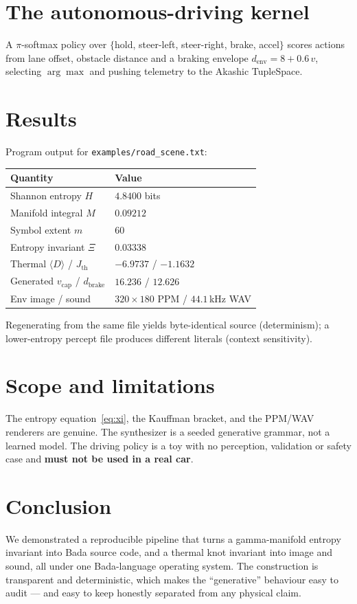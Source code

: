 \documentclass[11pt]{article}
\begin{document}
\section{The autonomous-driving kernel}
A $\pi$-softmax policy over $\{$hold, steer-left, steer-right, brake, accel$\}$
scores actions from lane offset, obstacle distance and a braking envelope
$d_{\text{env}}=8+0.6\,v$, selecting $\arg\max$ and pushing telemetry to the
Akashic TupleSpace.

\section{Results}
Program output for \texttt{examples/road\_scene.txt}:
\begin{center}
\begin{tabular}{l l}
\hline
Quantity & Value\\\hline
Shannon entropy $H$ & $4.8400$ bits\\
Manifold integral $M$ & $0.09212$\\
Symbol extent $m$ & $60$\\
Entropy invariant $\Xi$ & $0.03338$\\
Thermal $\langle D\rangle$ / $J_{\text{th}}$ & $-6.9737$ / $-1.1632$\\
Generated $v_{\text{cap}}$ / $d_{\text{brake}}$ & $16.236$ / $12.626$\\
Env image / sound & $320{\times}180$ PPM / $44.1\,$kHz WAV\\
\hline
\end{tabular}
\end{center}
Regenerating from the same file yields byte-identical source (determinism); a
lower-entropy percept file produces different literals (context sensitivity).

\section{Scope and limitations}
The entropy equation~\eqref{eq:xi}, the Kauffman bracket, and the PPM/WAV
renderers are genuine. The synthesizer is a seeded generative grammar, not a
learned model. The driving policy is a toy with no perception, validation or
safety case and \textbf{must not be used in a real car}.

\section{Conclusion}
We demonstrated a reproducible pipeline that turns a gamma-manifold entropy
invariant into Bada source code, and a thermal knot invariant into image and
sound, all under one Bada-language operating system. The construction is
transparent and deterministic, which makes the ``generative'' behaviour easy to
audit --- and easy to keep honestly separated from any physical claim.
\end{document}
